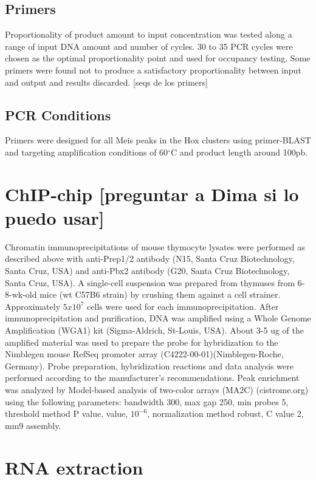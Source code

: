 \subsection{Primers}

Proportionality of product amount to input concentration was tested along a range of input DNA amount and number of cycles. 30 to 35 \ac{PCR} cycles were chosen as the optimal proportionality point and used for occupancy testing. Some primers were found not to produce a satisfactory proportionality between input and output and results discarded. [seqs de los primers]

\subsection{PCR Conditions}

Primers were designed for all Meis peaks in the Hox clusters using primer-BLAST and targeting amplification conditions of 60$^\circ$C and product length around 100pb. 

\section{ChIP-chip [preguntar a Dima si lo puedo usar]}

Chromatin immunoprecipitations of mouse thymocyte lysates were performed as described above with anti-Prep1/2 antibody (N15, Santa Cruz Biotechnology, Santa Cruz, USA) and anti-Pbx2 antibody (G20, Santa Cruz Biotechnology, Santa Cruz, USA). A single-cell suspension was prepared from thymuses from 6-8-wk-old mice (wt C57B6 strain) by crushing them against a cell strainer. Approximately $5x10^7$ cells were used for each immunoprecipitation. After immunoprecipitation and purification, DNA was amplified using a Whole Genome Amplification (WGA1) kit (Sigma-Aldrich, St-Louis, USA). About 3-5 ug of the amplified material was used to prepare the probe for hybridization to the Nimblegen mouse RefSeq promoter array (C4222-00-01)(Nimblegen-Roche, Germany). Probe preparation, hybridization reactions and data analysis were performed according to the manufacturer’s recommendations. Peak enrichment was analyzed by Model-based analysis of two-color arrays (MA2C) (cistrome.org) using the following parameters: bandwidth 300, max gap 250, min probes 5, threshold method P value, value, $10^{-6}$, normalization method robust, C value 2, mm9 assembly.

\section{RNA extraction}

